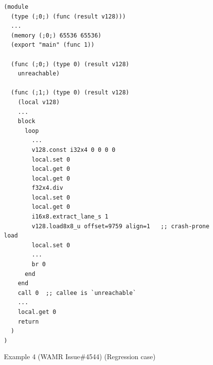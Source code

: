 \begin{figure}[!t]
    \centering
    \begin{lstlisting}
(module
  (type (;0;) (func (result v128)))
  ...
  (memory (;0;) 65536 65536)
  (export "main" (func 1))

  (func (;0;) (type 0) (result v128)
    unreachable)

  (func (;1;) (type 0) (result v128)
    (local v128)
    ...
    block
      loop
        ...
        v128.const i32x4 0 0 0 0
        local.set 0
        local.get 0
        local.get 0
        f32x4.div
        local.set 0
        local.get 0
        i16x8.extract_lane_s 1
        v128.load8x8_u offset=9759 align=1   ;; crash-prone load
        local.set 0
        ...
        br 0
      end
    end
    call 0  ;; callee is `unreachable`
    ...
    local.get 0
    return
  )
)
    \end{lstlisting}
    \caption{Example 4 (WAMR Issue\#4544) (Regression case)}
    \label{example:ex4}
\end{figure}

